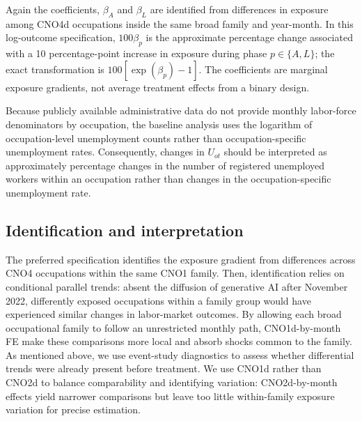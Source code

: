 \documentclass[11pt]{article}
\begin{document}
Again the coefficients, \(\beta_A\) and \(\beta_L\) are identified from differences in exposure among CNO4d occupations inside the same broad family and year-month. In this log-outcome specification, \(100\beta_p\) is the approximate percentage change associated with a 10 percentage-point increase in exposure during phase \(p\in\{A,L\}\); the exact transformation is \(100[\exp(\beta_p)-1]\). The coefficients are marginal exposure gradients, not average treatment effects from a binary design.

Because publicly available administrative data do not provide monthly labor-force denominators by occupation, the baseline analysis uses the logarithm of occupation-level unemployment counts rather than occupation-specific unemployment rates. Consequently, changes in $U_{ot}$ should be interpreted as approximately percentage changes in the number of registered unemployed workers within an occupation rather than changes in the occupation-specific unemployment rate.


\subsection{Identification and interpretation}
\label{sec:identification}

The preferred specification identifies the exposure gradient from differences across CNO4 occupations within the same CNO1 family. Then, identification relies on conditional parallel trends: absent the diffusion of generative AI after November 2022, differently exposed occupations within a family group would have experienced similar changes in labor-market outcomes. By allowing each broad occupational family to follow an unrestricted monthly path, CNO1d-by-month FE make these comparisons more local and absorb shocks common to the family. As mentioned above, we use event-study diagnostics to assess whether differential trends were already present before treatment. We use CNO1d rather than CNO2d to balance comparability and identifying variation: CNO2d-by-month effects yield narrower comparisons but leave too little within-family exposure variation for precise estimation.
\end{document}
